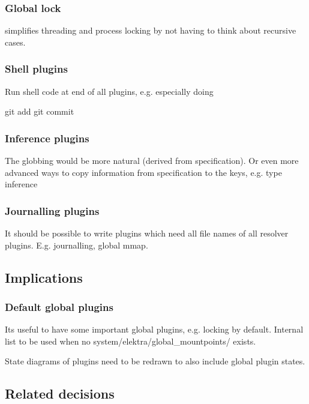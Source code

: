 \subsubsection*{Global lock}

simplifies threading and process locking by not having to think about recursive cases.

\subsubsection*{Shell plugins}

Run shell code at end of all plugins, e.\+g. especially doing \begin{DoxyVerb}git add
git commit
\end{DoxyVerb}


\subsubsection*{Inference plugins}

The globbing would be more natural (derived from specification). Or even more advanced ways to copy information from specification to the keys, e.\+g. type inference

\subsubsection*{Journalling plugins}

It should be possible to write plugins which need all file names of all resolver plugins. E.\+g. journalling, global mmap.

\subsection*{Implications}

\subsubsection*{Default global plugins}

Its useful to have some important global plugins, e.\+g. locking by default. Internal list to be used when no system/elektra/global\+\_\+mountpoints/ exists.

State diagrams of plugins need to be redrawn to also include global plugin states.

\subsection*{Related decisions}

